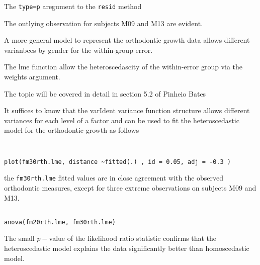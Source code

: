 \begin{description}
\begin{framed}
\begin{verbatim}
\end{verbatim}
\end{framed}

The \texttt{type=p} aregument to the \texttt{resid} method

The outlying observation for subjects M09 and M13 are evident.

% 



A more general model to represent the orthodontic growth data allows different varianbces by gender for the 
within-group error.

The lme function allow the heteroscedascity of the within-error group via the weights argument.

The topic will be covered in detail in section 5.2 of Pinheio Bates
\begin{framed}

It suffices to know that the varIdent variance function structure allows different variances for each level of a factor
and can be used to fit the heteroscedastic model for the orthodontic growth as follows
\begin{verbatim}

\end{verbatim}
\end{framed}

% 


\begin{framed}
\begin{verbatim}

plot(fm30rth.lme, distance ~fitted(.) , id = 0.05, adj = -0.3 )
\end{verbatim}
\end{framed}

the \texttt{fm30rth.lme} fitted values are in close agreement with the observed orthodontic measures, except for three
 extreme observations on subjects M09 and M13.



\begin{framed}
\begin{verbatim}

anova(fm20rth.lme, fm30rth.lme)
\end{verbatim}
\end{framed}


% 

The small $p-$value of the likelihood ratio statistic confirms that the heteroscedastic model
explains the data significantly better than homoscedastic model.


\end{description}
